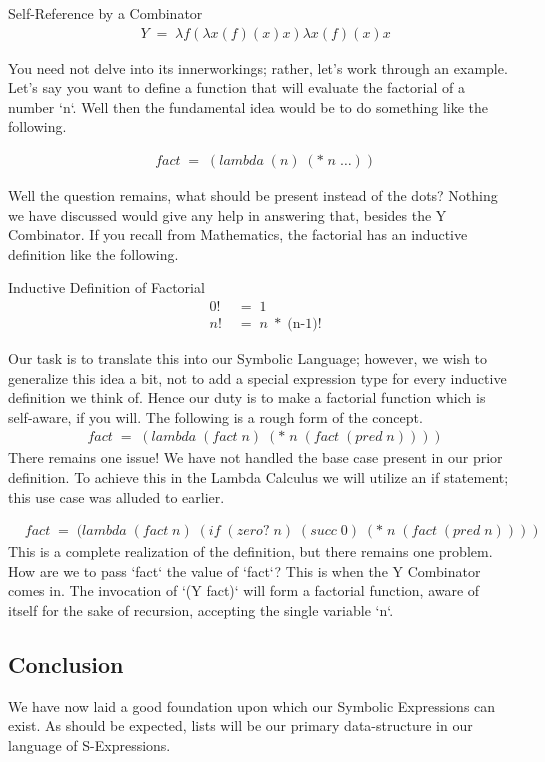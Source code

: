\documentclass[11pt]{article}
\begin{document}
Self-Reference by a Combinator
\begin{align*}
& Y \; = \; λf(λx(f)(x)x)λx(f)(x)x
\end{align*}

You need not delve into its innerworkings; rather, let's work through an example. Let's say you want to define a function that will evaluate the factorial of a number `n`. Well then the fundamental idea would be to do something like the following.

\begin{align*}
& fact \; = \; (lambda \; (n) \; (* \; n \; \dots))
\end{align*}

Well the question remains, what should be present instead of the dots? Nothing we have discussed would give any help in answering that, besides the Y Combinator. If you recall from Mathematics, the factorial has an inductive definition like the following.

Inductive Definition of Factorial
\begin{align*}
& 0! \; &= \; 1
\\& n! \; &= \; n \; * \; (\text{n-1)!}
\end{align*}

Our task is to translate this into our Symbolic Language; however, we wish to generalize this idea a bit, not to add a special expression type for every inductive definition we think of. Hence our duty is to make a factorial function which is self-aware, if you will. The following is a rough form of the concept.
\begin{align*}
& fact \; = \; (lambda \; (fact \; n) \; (* \; n \; (fact \; (pred \; n))))
\end{align*}
There remains one issue! We have not handled the base case present in our prior definition. To achieve this in the Lambda Calculus we will utilize an if statement; this use case was alluded to earlier.

\begin{align*}
& fact \; = \; (lambda \; (fact \; n) \; (if \; (zero? \; n) \; (succ \; 0) \; (* \; n \; (fact \; (pred \; n))))
\end{align*}
This is a complete realization of the definition, but there remains one problem. How are we to pass `fact` the value of `fact`? This is when the Y Combinator comes in. The invocation of `(Y fact)` will form a factorial function, aware of itself for the sake of recursion, accepting the single variable `n`.

\subsection{Conclusion}
We have now laid a good foundation upon which our Symbolic Expressions can exist. As should be expected, lists will be our primary data-structure in our language of S-Expressions.
\end{document}
